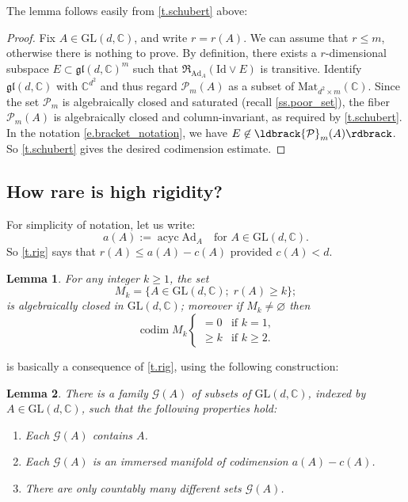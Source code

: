 \documentclass[10pt, a4paper]{amsart}
\theoremstyle{plain}
\newtheorem{lemma}{Lemma}[section]
\theoremstyle{definition}
\theoremstyle{remark}
\theoremstyle{note}
\numberwithin{equation}{section}
\begin{document}
The lemma follows easily from \cref{t.schubert} above:

\begin{proof} 
Fix $A \in {\mathrm{GL}}(d,{\mathbb{C}})$, and write $r=r(A)$.
We can assume that $r \le m$, otherwise there is nothing to prove.
By definition, there exists a $r$-dimensional subspace $E \subset {\mathfrak{gl}}(d,{\mathbb{C}})^m$
such that ${\mathfrak{R}}_{{\mathrm{Ad}}_A}({\mathrm{Id}} \vee E)$ is transitive.
Identify ${\mathfrak{gl}}(d,{\mathbb{C}})$ with ${\mathbb{C}}^{d^2}$ and thus
regard ${\mathcal{P}}_m(A)$ as a subset of ${\mathrm{Mat}}_{d^2 \times m} ({\mathbb{C}})$.
Since the set ${\mathcal{P}}_m$ is algebraically closed and saturated (recall \cref{ss.poor_set}),
the fiber ${\mathcal{P}}_m(A)$ is algebraically closed and column-invariant,
as required by \cref{t.schubert}.
In the notation \eqref{e.bracket_notation}, 
we have $E \not\in \ldbrack {\mathcal{P}}_m(A) \rdbrack$.
So \cref{t.schubert} gives the desired codimension estimate.
\end{proof}

\subsection{How rare is high rigidity?}

For simplicity of notation, let us write:
$$
a(A) := \operatorname{acyc} {\mathrm{Ad}}_A  \quad \text{for $A \in {\mathrm{GL}}(d,{\mathbb{C}})$.}
$$
So \cref{t.rig} says that $r(A) \le a(A)-c(A)$ provided $c(A) < d$.

\begin{lemma}\label{l.cod rig}
For any integer $k \ge 1$, the set
$$
M_k = \big\{ A \in {\mathrm{GL}}(d,{\mathbb{C}})  ; \; r(A) \ge k \big\};
$$
is algebraically closed in ${\mathrm{GL}}(d,{\mathbb{C}})$;
moreover if $M_k \neq {\varnothing}$ then
$$
\operatorname{codim} M_k
\begin{cases}
= 0   &\text{if $k=1$,} \\
\ge k &\text{if $k \ge 2$.}
\end{cases}
$$
\end{lemma}

	

 is basically a consequence of \cref{t.rig},
using the following construction:

\begin{lemma}\label{l.countable cover}
There is a family ${\mathcal{G}}(A)$ of subsets of ${\mathrm{GL}}(d,{\mathbb{C}})$, indexed by $A\in {\mathrm{GL}}(d,{\mathbb{C}})$,
such that the following properties hold:
\begin{enumerate}
\item \label{i.contains}
Each ${\mathcal{G}}(A)$ contains $A$.
\item \label{i.manifold}
Each ${\mathcal{G}}(A)$ is an immersed manifold of codimension $a(A)-c(A)$.
\item \label{i.countable}
There are only countably many different sets ${\mathcal{G}}(A)$.
\end{enumerate}
\end{lemma}
 
\end{document}
